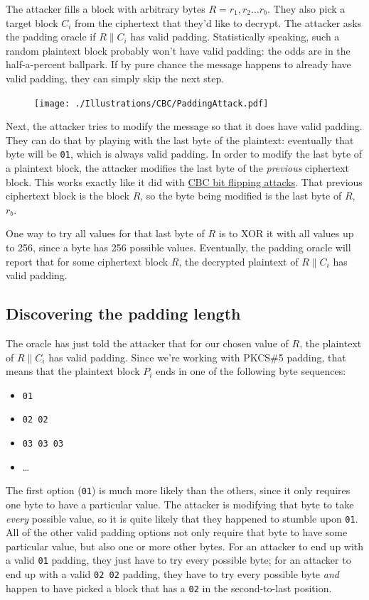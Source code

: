 \documentclass[11pt,ebook,table,dvipsnames]{memoir}
\begin{document}
The attacker fills a block with arbitrary bytes $R = r_1, r_2\ldots
r_b$. They also pick a target block $C_i$ from the ciphertext that
they'd like to decrypt. The attacker asks the padding oracle if $R \|
C_i$ has valid padding. Statistically speaking, such a random
plaintext block probably won't have valid padding: the odds are in the
half-a-percent ballpark. If by pure chance the message happens to
already have valid padding, they can simply skip the next step.

\begin{figure}[ht!]
\centering
\texttt{[image: ./Illustrations/CBC/PaddingAttack.pdf]}
\end{figure}

Next, the attacker tries to modify the message so that it does have
valid padding. They can do that by playing with the last byte of the
plaintext: eventually that byte will be \verb~01~, which is always valid
padding. In order to modify the last byte of a plaintext block, the
attacker modifies the last byte of the \emph{previous} ciphertext block.
This works exactly like it did with \hyperref[CBC-bit-flipping-attacks]{CBC bit flipping attacks}. That
previous ciphertext block is the block $R$, so the byte being modified
is the last byte of $R$, $r_b$.

One way to try all values for that last byte of $R$ is to XOR it with
all values up to 256, since a byte has 256 possible values.
Eventually, the padding oracle will report that for some ciphertext
block $R$, the decrypted plaintext of $R \| C_i$ has valid padding.
\subsection{Discovering the padding length}
\label{sec-2-3-7-2}

The oracle has just told the attacker that for our chosen value of
$R$, the plaintext of $R \| C_i$ has valid padding. Since we're
working with PKCS\#5 padding, that means that the plaintext block $P_i$
ends in one of the following byte sequences:

\begin{itemize}
\item \verb~01~
\item \verb~02 02~
\item \verb~03 03 03~
\item \ldots
\end{itemize}

The first option (\verb~01~) is much more likely than the others, since it
only requires one byte to have a particular value. The attacker is
modifying that byte to take \emph{every} possible value, so it is quite
likely that they happened to stumble upon \verb~01~. All of the other valid
padding options not only require that byte to have some particular
value, but also one or more other bytes. For an attacker to end up
with a valid \verb~01~ padding, they just have to try every possible byte;
for an attacker to end up with a valid \verb~02 02~ padding, they have to
try every possible byte \emph{and} happen to have picked a block that has a
\verb~02~ in the second-to-last position.
\end{document}
